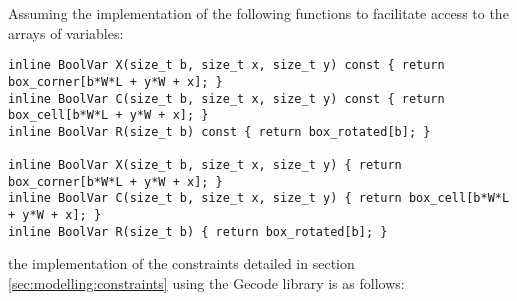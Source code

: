 Assuming the implementation of the following functions to facilitate
access to the arrays of variables:

{\NOINDENT \begin{lstlisting}
inline BoolVar X(size_t b, size_t x, size_t y) const { return box_corner[b*W*L + y*W + x]; }
inline BoolVar C(size_t b, size_t x, size_t y) const { return box_cell[b*W*L + y*W + x]; }
inline BoolVar R(size_t b) const { return box_rotated[b]; }

inline BoolVar X(size_t b, size_t x, size_t y) { return box_corner[b*W*L + y*W + x]; }
inline BoolVar C(size_t b, size_t x, size_t y) { return box_cell[b*W*L + y*W + x]; }
inline BoolVar R(size_t b) { return box_rotated[b]; }
\end{lstlisting}}

the implementation of the constraints detailed in section \ref{sec:modelling:constraints}
using the Gecode library is as follows:

